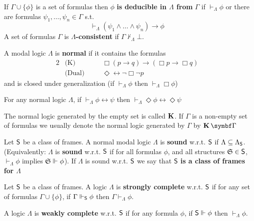 \documentclass[11pt]{article}
\begin{document}
\begin{definition}[]
If \(\Gamma\cup\{\phi\}\) is a set of formulas then \(\phi\) \textbf{is deducible in \(\Lambda\) from}
\(\Gamma\) if \(\vdash_\Lambda\phi\) or there are formulas
\(\psi_1,\dots,\psi_n\in\Gamma\) s.t.
\begin{equation*}
\vdash_\Lambda(\psi_1\wedge\dots\wedge\psi_n)\to\phi
\end{equation*}
A set of formulas \(\Gamma\) is \textbf{\(\Lambda\)-consistent} if \(\Gamma\not\vdash_\Lambda\bot\).
\end{definition}



\begin{definition}[]
A modal logic \(\Lambda\) is \textbf{normal} if it contains the formulas
\begin{alignat*}{2}
&\text{(K)}&&\Box(p\to q)\to(\Box p\to\Box q)\\
&\text{(Dual)}\quad&&\Diamond\leftrightarrow\neg\Box\neg p
\end{alignat*}
and is closed under generalization (if \(\vdash_{\Lambda}\phi\) then \(\vdash_{\Lambda}\Box\phi\))
\end{definition}

\begin{lemma}[]
For any normal logic \(\Lambda\), if \(\vdash_\Lambda\phi\leftrightarrow\psi\) then
\(\vdash_\Lambda\Diamond\phi\leftrightarrow\Diamond\psi\)
\end{lemma}

The normal logic generated by the empty set is called \(\operatorname{\textbf{K}}\). If \(\Gamma\) is a
non-empty set of formulas we usually denote the normal logic generated by \(\Gamma\)
by \(\bK\bGamma\)


\begin{definition}[Soundness]
Let \(\textsf{S}\) be a class of frames. A normal modal logic \(\Lambda\) is \textbf{sound} w.r.t.
\(\textsf{S}\) if \(\Lambda\subseteq\Lambda_{\textsf{S}}\). (Equivalently: \(\Lambda\) is \textbf{sound}
w.r.t. \(\textsf{S}\) if for all formulas \(\phi\), and all structures \(\mathfrak{S}\in\textsf{S}\),
\(\vdash_\Lambda\phi\) implies \(\mathfrak{S}\Vdash\phi\)). If \(\Lambda\) is sound w.r.t.
\(\textsf{S}\) we say that \(\textsf{S}\) \textbf{is a class of frames for \(\Lambda\)}
\end{definition}


\begin{definition}[Completeness]
Let \(\textsf{S}\) be a class of frames. A logic \(\Lambda\) is \textbf{strongly complete} w.r.t.
\(\textsf{S}\) if for any set of formulas \(\Gamma\cup\{\phi\}\), if
\(\Gamma\Vdash_{\textsf{S}}\phi\) then \(\Gamma\vdash_\Lambda\phi\).

A logic \(\Lambda\) is \textbf{weakly complete} w.r.t. \(\textsf{S}\) if for any formula \(\phi\), if
\(\textsf{S}\Vdash\phi\) then \(\vdash_\Lambda\phi\).
\end{definition}
\end{document}
